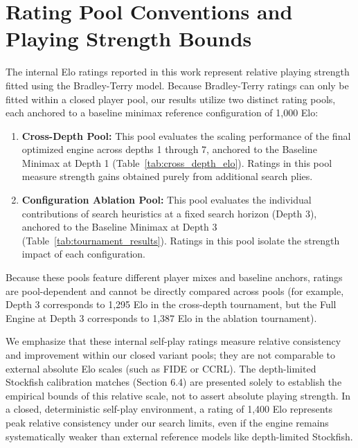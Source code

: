 \section{Rating Pool Conventions and Playing Strength Bounds}
\label{sec:rating_conventions}

The internal Elo ratings reported in this work represent relative playing strength fitted using the Bradley-Terry model. Because Bradley-Terry ratings can only be fitted within a closed player pool, our results utilize two distinct rating pools, each anchored to a baseline minimax reference configuration of 1,000 Elo:
\begin{enumerate}
    \item \textbf{Cross-Depth Pool:} This pool evaluates the scaling performance of the final optimized engine across depths 1 through 7, anchored to the Baseline Minimax at Depth 1 (Table~\ref{tab:cross_depth_elo}). Ratings in this pool measure strength gains obtained purely from additional search plies.
    \item \textbf{Configuration Ablation Pool:} This pool evaluates the individual contributions of search heuristics at a fixed search horizon (Depth 3), anchored to the Baseline Minimax at Depth 3 (Table~\ref{tab:tournament_results}). Ratings in this pool isolate the strength impact of each configuration.
\end{enumerate}
Because these pools feature different player mixes and baseline anchors, ratings are pool-dependent and cannot be directly compared across pools (for example, Depth 3 corresponds to 1,295 Elo in the cross-depth tournament, but the Full Engine at Depth 3 corresponds to 1,387 Elo in the ablation tournament).

We emphasize that these internal self-play ratings measure relative consistency and improvement within our closed variant pools; they are not comparable to external absolute Elo scales (such as FIDE or CCRL). The depth-limited Stockfish calibration matches (Section 6.4) are presented solely to establish the empirical bounds of this relative scale, not to assert absolute playing strength. In a closed, deterministic self-play environment, a rating of 1,400 Elo represents peak relative consistency under our search limits, even if the engine remains systematically weaker than external reference models like depth-limited Stockfish.
